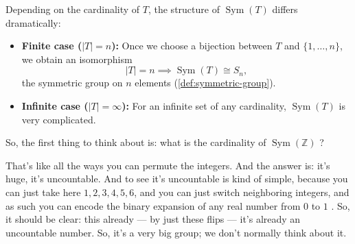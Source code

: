 \begin{content}
Depending on the cardinality of $T$, the structure of $\operatorname{Sym}(T)$ differs dramatically:
\begin{itemize}
    \item \textbf{Finite case ($|T| = n$):} Once we choose a bijection between $T$ and $\{1, \dots, n\}$, we obtain an isomorphism
    \[
    |T| = n \implies \operatorname{Sym}(T) \cong S_n,
    \]
    the symmetric group on $n$ elements (\cref{def:symmetric-group}).
    \item \textbf{Infinite case ($|T| = \infty$):} For an infinite set of any cardinality, $\operatorname{Sym}(T)$ is very complicated.
\end{itemize}
\end{content}

\begin{speech}[00:01:23 - 00:02:17]
So, the first thing to think about is: what is the cardinality of $\operatorname{Sym}(\mathbb{Z})$ ?

That's like all the ways you can permute the integers. And the answer is: it's huge, it's uncountable. And to see it's uncountable is kind of simple, because you can just take here $1, 2, 3, 4, 5, 6$, and you can just switch neighboring integers, and as such you can encode the binary expansion of any real number from $0$ to $1$ . So, it should be clear: this already --- by just these flips --- it's already an uncountable number. So, it's a very big group; we don't normally think about it.
\end{speech}

